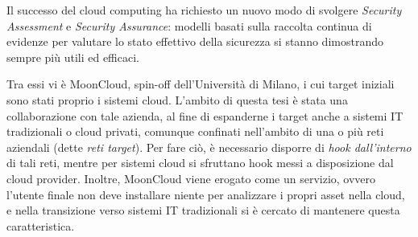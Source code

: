 \documentclass[10pt,a4paper]{article}
\begin{document}
        Il successo del cloud computing ha richiesto un nuovo modo di svolgere
        \textit{Security Assessment} e \textit{Security Assurance}: modelli
        basati sulla raccolta continua di evidenze per valutare lo stato effettivo della
        sicurezza si stanno dimostrando sempre più utili ed efficaci.

        Tra essi vi è MoonCloud, spin-off dell'Università di Milano, i cui target iniziali
        sono stati proprio i sistemi cloud. L'ambito di questa tesi è stata una collaborazione
        con tale azienda, al fine di espanderne i target anche a sistemi IT tradizionali
        o cloud privati, comunque confinati nell'ambito di una o più reti aziendali
        (dette \textit{reti target}).
        Per fare ciò, è necessario disporre di \textit{hook dall'interno} di tali
        reti, mentre per sistemi cloud si sfruttano hook messi a disposizione dal
        cloud provider.
        Inoltre, MoonCloud viene erogato come un servizio, ovvero l'utente finale
        non deve installare niente per analizzare i propri asset nella cloud, e nella transizione
        verso sistemi IT tradizionali si è cercato di mantenere questa caratteristica.
\end{document}

